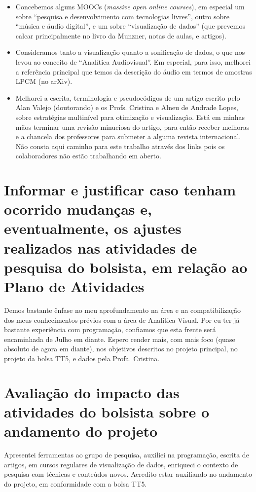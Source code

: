 \documentclass[a4paper, 11pt]{article}
\begin{document}
\begin{itemize}
  \item Concebemos alguns MOOCs (\emph{massive open online courses}), em especial um sobre ``pesquisa e desenvolvimento com tecnologias livres'', outro sobre ``música e áudio digital'', e um sobre ``visualização de dados'' (que prevemos calcar principalmente no livro da Munzner, notas de aulas, e artigos).
  \item Consideramos tanto a visualização quanto a sonificação de dados, o que nos levou ao conceito de ``Analítica Audiovisual''. Em especial, para isso, melhorei a referência principal que temos da descrição do áudio em termos de amostras LPCM (no arXiv).
  \item Melhorei a escrita, terminologia e pseudocódigos de um artigo escrito pelo Alan Valejo (doutorando) e os Profs. Cristina e Alneu de Andrade Lopes, sobre estratégias multinível para otimização e visualização. Está em minhas mãos terminar uma revisão minuciosa do artigo, para então receber melhoras e a chancela dos professores para submeter a alguma revista internacional. Não consta aqui caminho para este trabalho através dos links pois os colaboradores não estão trabalhando em aberto.
\end{itemize}

\section{Informar e justificar caso tenham ocorrido mudanças e, eventualmente, os ajustes realizados nas atividades de pesquisa do bolsista, em relação ao Plano de Atividades}
Demos bastante ênfase no meu aprofundamento na área e na compatibilização dos meus conhecimentos prévios com a área de Analítica Visual.
Por eu ter já bastante experiência com programação, confiamos que esta frente será encaminhada de Julho em diante.
Espero render mais, com mais foco (quase absoluto de agora em diante), nos objetivos descritos no projeto principal,
no projeto da bolsa TT5, e dados pela Profa. Cristina.


\section{Avaliação do impacto das atividades do bolsista sobre o andamento do projeto}
Apresentei ferramentas ao grupo de pesquisa, auxiliei na programação, escrita de artigos, em cursos regulares de visualização de dados,
enriqueci o contexto de pesquisa com técnicas e conteúdos novos.
Acredito estar auxiliando no andamento do projeto, em conformidade com a bolsa TT5.
\end{document}
